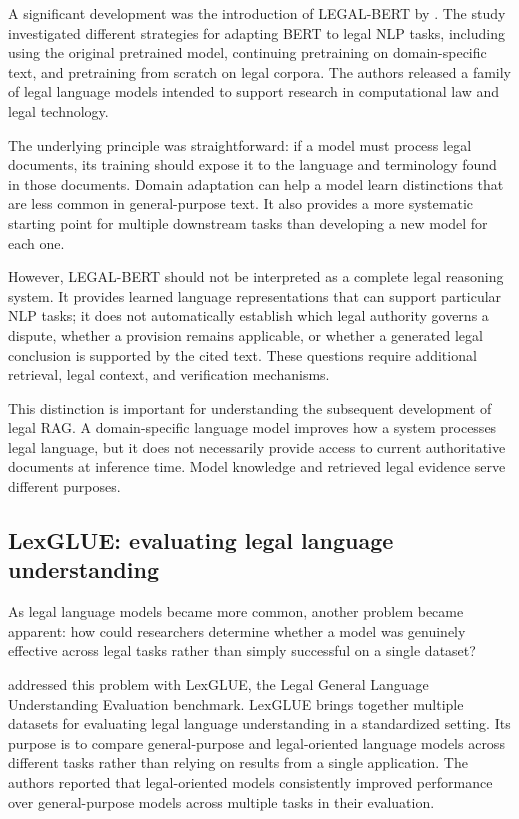 A significant development was the introduction of LEGAL-BERT by \citet{chalkidis2020}. The study
investigated different strategies for adapting BERT to legal NLP tasks, including using the original
pretrained model, continuing pretraining on domain-specific text, and pretraining from scratch on
legal corpora. The authors released a family of legal language models intended to support research
in computational law and legal technology.

The underlying principle was straightforward: if a model must process legal documents, its training
should expose it to the language and terminology found in those documents. Domain adaptation can
help a model learn distinctions that are less common in general-purpose text. It also provides a more
systematic starting point for multiple downstream tasks than developing a new model for each one.

However, LEGAL-BERT should not be interpreted as a complete legal reasoning system. It provides
learned language representations that can support particular NLP tasks; it does not automatically
establish which legal authority governs a dispute, whether a provision remains applicable, or whether
a generated legal conclusion is supported by the cited text. These questions require additional
retrieval, legal context, and verification mechanisms.

This distinction is important for understanding the subsequent development of legal RAG. A
domain-specific language model improves how a system processes legal language, but it does not
necessarily provide access to current authoritative documents at inference time. Model knowledge and
retrieved legal evidence serve different purposes.

\subsection{LexGLUE: evaluating legal language understanding}

As legal language models became more common, another problem became apparent: how could researchers
determine whether a model was genuinely effective across legal tasks rather than simply successful on
a single dataset?

\citet{chalkidis2022} addressed this problem with LexGLUE, the Legal General Language Understanding
Evaluation benchmark. LexGLUE brings together multiple datasets for evaluating legal language
understanding in a standardized setting. Its purpose is to compare general-purpose and legal-oriented
language models across different tasks rather than relying on results from a single application. The
authors reported that legal-oriented models consistently improved performance over general-purpose
models across multiple tasks in their evaluation.

